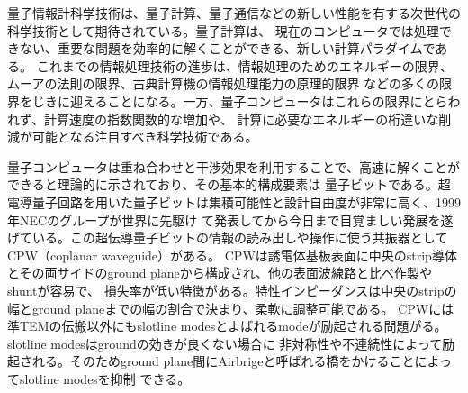量子情報計科学技術は、量子計算、量子通信などの新しい性能を有する次世代の科学技術として期待されている。量子計算は、
現在のコンピュータでは処理できない、重要な問題を効率的に解くことができる、新しい計算パラダイムである。
これまでの情報処理技術の進歩は、情報処理のためのエネルギーの限界、ムーアの法則の限界、古典計算機の情報処理能力の原理的限界
などの多くの限界をじきに迎えることになる。一方、量子コンピュータはこれらの限界にとらわれず、計算速度の指数関数的な増加や、
計算に必要なエネルギーの桁違いな削減が可能となる注目すべき科学技術である。

量子コンピュータは重ね合わせと干渉効果を利用することで、高速に解くことができると理論的に示されており、その基本的構成要素は
量子ビットである。超電導量子回路を用いた量子ビットは集積可能性と設計自由度が非常に高く、1999年NECのグループが世界に先駆け
て発表してから今日まで目覚ましい発展を遂げている。この超伝導量子ビットの情報の読み出しや操作に使う共振器としてCPW（coplanar waveguide）がある。
CPWは誘電体基板表面に中央のstrip導体とその両サイドのground planeから構成され、他の表面波線路と比べ作製やshuntが容易で、
損失率が低い特徴がある。特性インピーダンスは中央のstripの幅とground planeまでの幅の割合で決まり、柔軟に調整可能である。
CPWには準TEMの伝搬以外にもslotline modesとよばれるmodeが励起される問題がる。slotline modesはgroundの効きが良くない場合に
非対称性や不連続性によって励起される。そのためground plane間にAirbrigeと呼ばれる橋をかけることによってslotline modesを抑制
できる。
